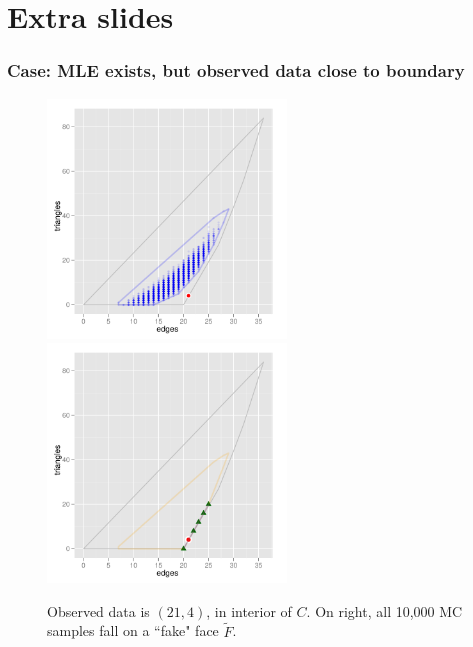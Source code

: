 \documentclass[ 10pt]{beamer}
\begin{document}
\appendix
{}
\setcounter{finalframe}{\value{framenumber}}







\section{Extra slides}
\frame
{
\frametitle{Case: MLE exists, but observed data close to boundary}  
\begin{figure}[h]
\centering
\includegraphics[height=2.5in]{MCsample-problem}
\includegraphics[height=2.5in]{MCsample-fakeface}
\caption{Observed data is $(21,4)$, in interior of $C$.  On right, all 10,000 MC samples 
fall on a ``fake" face $\tilde{F}$.}
\end{figure}
}
\end{document}
